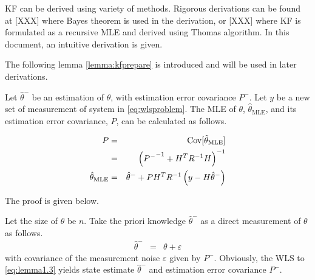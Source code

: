 KF can be derived using variety of methods. Rigorous derivations can be found at [XXX] where Bayes theorem is used in the derivation, or [XXX] where KF is formulated as a recursive MLE and derived using Thomas algorithm. In this document, an intuitive derivation is given.

The following lemma \ref{lemma:kfprepare} is introduced and will be used in later derivations.

\begin{lemma} \label{lemma:kfprepare}
	
	Let $\hat{\theta}^-$ be an estimation of $\theta$, with estimation error covariance $P^-$. Let $y$ be a new set of measurement of system in \eqref{eq:wlsproblem}. The MLE of $\theta$, $\hat{\theta}_{\mathrm{MLE}}$, and its estimation error covariance, $P$, can be calculated as follows.
	
	\begin{eqnarray}
		P &=& \textup{Cov}[\tilde{\theta}_{\textup{MLE}}] \nonumber \\
		&=& \left({P^-}^{-1}+H^TR^{-1}H\right)^{-1} \label{eq:lemma1.2} \\
		\hat{\theta}_{\textup{MLE}} &=& \hat{\theta}^- + PH^TR^{-1}\left(y - H\hat{\theta}^-\right) \label{eq:lemma1.1}
	\end{eqnarray} 
	
	The proof is given below.
	
	Let the size of $\theta$ be $n$. Take the priori knowledge $\hat{\theta}^-$ as a direct measurement of $\theta$ as follows.
	\begin{eqnarray}
		\hat{\theta}^- &=& \theta + \varepsilon \label{eq:lemma1.3}
	\end{eqnarray}
	with covariance of the measurement noise $\varepsilon$ given by $P^-$. Obviously, the WLS to \eqref{eq:lemma1.3} yields state estimate $\hat{\theta}^-$ and estimation error covariance $P^-$.
	

\end{lemma}
